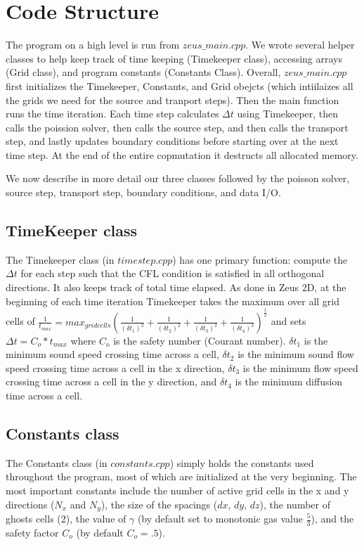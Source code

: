 \section{Code Structure}
The program on a high level is run from $zeus\_main.cpp$. We wrote several helper classes to help keep track of time keeping (Timekeeper class), accessing arrays (Grid class), and program constants (Constants Class). Overall, $zeus\_main.cpp$ first initializes the Timekeeper, Constants, and Grid obejcts (which intiilaizes all the grids we need for the source and tranport steps). Then the main function runs the time iteration. Each time step calculates $\Delta t$ using Timekeeper, then calls the poission solver, then calls the source step, and then calls the transport step, and lastly updates boundary conditions before starting over at the next time step. At the end of the entire copmutation it destructs all allocated memory. 

We now describe in more detail our three classes followed by the poisson solver, source step, transport step, boundary conditions, and data I/O.
\subsection{TimeKeeper class}
The Timekeeper class (in $timestep.cpp$) has one primary function: compute the $\Delta t$ for each step such that the CFL condition is satisfied in all orthogonal directions. It also keeps track of total time elapsed. As done in Zeus 2D, at the beginning of each time iteration Timekeeper takes the maximum over all grid cells of $\frac{1}{t_{max}}=max_{grid cells}(\frac{1}{(\delta t_1)^2}+\frac{1}{(\delta t_2)^2}+\frac{1}{(\delta t_3)^2}+\frac{1}{(\delta t_4)^2})^{\frac{1}{2}}$ and sets $\Delta t=C_o *t_{max}$ where $C_o$ is the safety number (Courant number). $\delta t_1$ is the minimum sound speed crossing time across a cell, $\delta t_2$ is the minimum sound flow speed crossing time across a cell in the x direction, $\delta t_3$ is the minimum flow speed crossing time across a cell in the y direction, and $\delta t_4$ is the minimum diffusion time across a cell. 
\subsection{Constants class}
The Constants class (in $constants.cpp$) simply holds the constants used throughout the program, most of which are initialized at the very beginning. The most important constants include the number of active grid cells in the x and y directions ($N_x$ and $N_y$), the size of the spacings ($dx$, $dy$, $dz$), the number of ghosts cells (2), the value of $\gamma$ (by default set to monotonic gas value $\frac{5}{3}$), and the safety factor $C_o$ (by default $C_o=.5$).
